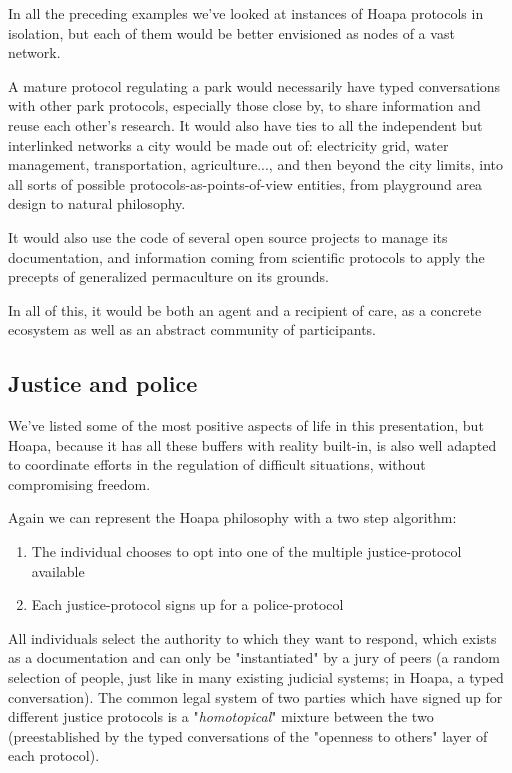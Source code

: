 \documentclass[11pt]{article}
\begin{document}
In all the preceding examples we've looked at instances of Hoapa protocols in isolation, but each of them would be better envisioned as nodes of a vast network.

A mature protocol regulating a park would necessarily have typed conversations with other park protocols, especially those close by, to share information and reuse each other's research. It would also have ties to all the independent but interlinked networks a city would be made out of: electricity grid, water management, transportation, agriculture..., and then beyond the city limits, into all sorts of possible protocols-as-points-of-view entities, from playground area design to natural philosophy.

It would also use the code of several open source projects to manage its documentation, and information coming from scientific protocols to apply the precepts of generalized permaculture on its grounds.

In all of this, it would be both an agent and a recipient of care, as a concrete ecosystem as well as an abstract community of participants.

\subsection{Justice and police}

We've listed some of the most positive aspects of life in this presentation, but Hoapa, because it has all these buffers with reality built-in, is also well adapted to coordinate efforts in the regulation of difficult situations, without compromising freedom.

Again we can represent the Hoapa philosophy with a two step algorithm:

\begin{enumerate}

\item The individual chooses to opt into one of the multiple justice-protocol available

\item Each justice-protocol signs up for a police-protocol

\end{enumerate}

All individuals select the authority to which they want to respond, which exists as a documentation and can only be "instantiated" by a jury of peers (a random selection of people, just like in many existing judicial systems; in Hoapa, a typed conversation). The common legal system of two parties which have signed up for different justice protocols is a "\emph{homotopical}" mixture between the two (preestablished by the typed conversations of the "openness to others" layer of each protocol).
\end{document}
